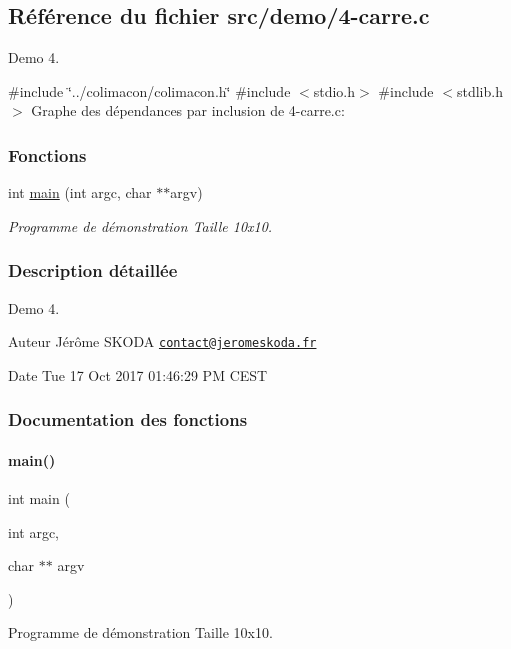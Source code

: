 \hypertarget{4-carre_8c}{}\subsection{Référence du fichier src/demo/4-\/carre.c}
\label{4-carre_8c}


Demo 4.  


{\ttfamily \#include \char`\"{}../colimacon/colimacon.\+h\char`\"{}}\newline
{\ttfamily \#include $<$stdio.\+h$>$}\newline
{\ttfamily \#include $<$stdlib.\+h$>$}\newline
Graphe des dépendances par inclusion de 4-\/carre.c\+:
\subsubsection*{Fonctions}
\begin{DoxyCompactItemize}
\item 
int \hyperlink{4-carre_8c_a3c04138a5bfe5d72780bb7e82a18e627}{main} (int argc, char $\ast$$\ast$argv)
\begin{DoxyCompactList}\small\item\em Programme de démonstration Taille 10x10. \end{DoxyCompactList}\end{DoxyCompactItemize}


\subsubsection{Description détaillée}
Demo 4. 

\begin{DoxyAuthor}{Auteur}
Jérôme S\+K\+O\+DA \href{mailto:contact@jeromeskoda.fr}{\tt contact@jeromeskoda.\+fr} 
\end{DoxyAuthor}
\begin{DoxyDate}{Date}
Tue 17 Oct 2017 01\+:46\+:29 PM C\+E\+ST 
\end{DoxyDate}


\subsubsection{Documentation des fonctions}
\mbox{\label{4-carre_8c_a3c04138a5bfe5d72780bb7e82a18e627}} 
\paragraph{\texorpdfstring{main()}{main()}}
{\footnotesize\ttfamily int main (\begin{DoxyParamCaption}\item[{int}]{argc,  }\item[{char $\ast$$\ast$}]{argv }\end{DoxyParamCaption})}



Programme de démonstration Taille 10x10. 

